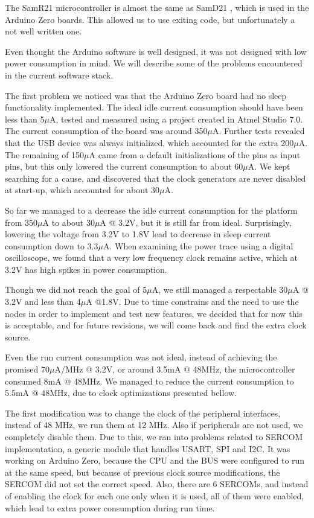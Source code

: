 The SamR21 microcontroller is almost the same as SamD21 \cite{samd21}, which is used in the Arduino
Zero boards. This allowed us to use exiting code, but unfortunately a not well
written one.

Even thought the Arduino software is well designed, it was not designed with low power consumption
in mind. We will describe some of the problems encountered in the current software stack.

The first problem we noticed was that the Arduino Zero board had no sleep functionality implemented.
The ideal idle current consumption should have been less than 5$\mu$A, tested and measured using a
project created in Atmel Studio 7.0. The current consumption of the board was around 350${\mu}$A. Further
tests revealed that the USB device was always initialized, which accounted for the extra
200${\mu}$A.
The remaining of 150${\mu}$A came from a default initializations of the pins as input pins, but this only
lowered the current consumption to about 60${\mu}$A. We kept searching for a cause, and discovered that
the clock generators are never disabled at start-up, which accounted for about 30${\mu}$A.

So far we managed to a decrease the idle current consumption for the platform from 350${\mu}$A to about
30${\mu}$A @ 3.2V, but it is still far from ideal. Surprisingly, lowering the voltage from 3.2V to 1.8V lead
to  decrease in sleep current consumption down to 3.3${\mu}$A. When examining the power trace using a digital oscilloscope, we found
that a very low frequency clock remains active, which at 3.2V has high spikes in power consumption.

Though we did not reach the goal of 5${\mu}$A, we still managed a respectable 30${\mu}$A @ 3.2V and
less than 4${\mu}$A @1.8V.
Due to time constrains and the need to use the nodes in order to implement and test new
features, we decided that for now this is acceptable, and for future revisions, we will come back
and find the extra clock source.

Even the run current consumption was not ideal, instead of achieving the promised 70${\mu}$A/MHz @ 3.2V,
or around 3.5mA @ 48MHz, the microcontroller consumed 8mA @ 48MHz. We managed to reduce the current consumption to 5.5mA @ 48MHz, due to
clock optimizations presented bellow.

The first modification was to change the clock of the peripheral interfaces, instead of 48 MHz, we run them at 12 MHz.
Also if peripherals are not used, we completely disable them. Due to this, we ran into problems
related to SERCOM implementation, a generic module that handles USART, SPI and I2C. It was working
on Arduino Zero, because the CPU and the BUS were configured to run at the same speed, but because of
previous clock source modifications, the SERCOM did not set the correct speed. Also, there are 6
SERCOMs, and instead of enabling the clock for each one only when it is used, all of them were
enabled, which lead to extra power consumption during run time.

